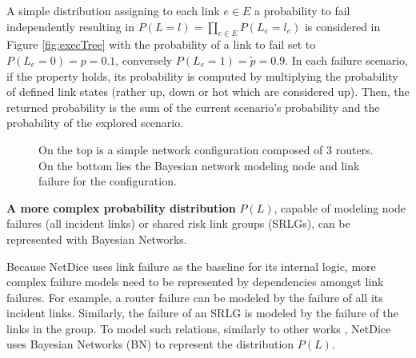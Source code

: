 A simple distribution assigning to each link $e \in E$ a probability to fail independently resulting in $P(L = l) = \prod_{e \in E} P(L_e = l_e)$ is considered in Figure \ref{fig:execTree} with the probability of a link to fail set to $P(L_e = 0)=p=0.1$, conversely $P(L_e = 1)=\tilde{p}=0.9$.
In each failure scenario, if the property holds, its probability is computed by multiplying the probability of defined link states (rather up, down or hot which are considered up).
Then, the returned probability is the sum of the current scenario's probability and the probability of the explored scenario.

\begin{figure}[t]
	\centering
	\vfil
	\caption{On the top is a simple network configuration composed of 3 routers. On the bottom lies the Bayesian network modeling node and link failure for the configuration.}\label{fig:BN}
\end{figure}

\textbf{A more complex probability distribution} $P(L)$, capable of modeling node failures (all incident links) or shared risk link groups (SRLGs), can be represented with  Bayesian Networks.

Because NetDice uses link failure as the baseline for its internal logic, more complex failure models need to be represented by dependencies amongst link failures. For example, a router failure can be modeled by the failure of all its incident links. 
Similarly, the failure of an SRLG is modeled by the failure of the links in the group. 
To model such relations, similarly to other works \cite{BN1,BN2}, NetDice uses Bayesian Networks (BN) to represent the distribution $P(L)$. 


